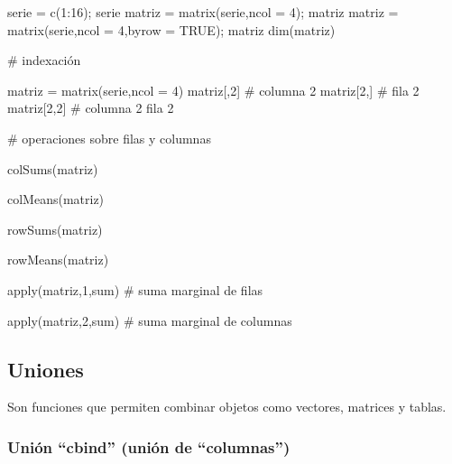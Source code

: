 \documentclass[
  spanish,
  letterpaper,
  DIV=11,
  numbers=noendperiod]{scrreprt}
\newenvironment{Shaded}{\begin{snugshade}}{\end{snugshade}}
\newcommand{\AttributeTok}[1]{\textcolor[rgb]{0.40,0.45,0.13}{#1}}
\newcommand{\CommentTok}[1]{\textcolor[rgb]{0.37,0.37,0.37}{#1}}
\newcommand{\ConstantTok}[1]{\textcolor[rgb]{0.56,0.35,0.01}{#1}}
\newcommand{\DecValTok}[1]{\textcolor[rgb]{0.68,0.00,0.00}{#1}}
\newcommand{\FunctionTok}[1]{\textcolor[rgb]{0.28,0.35,0.67}{#1}}
\newcommand{\NormalTok}[1]{\textcolor[rgb]{0.00,0.23,0.31}{#1}}
\newcommand{\OtherTok}[1]{\textcolor[rgb]{0.00,0.23,0.31}{#1}}
\newcommand{\SpecialCharTok}[1]{\textcolor[rgb]{0.37,0.37,0.37}{#1}}
\begin{document}
\begin{Shaded}
\begin{Highlighting}[]

\NormalTok{serie }\OtherTok{=} \FunctionTok{c}\NormalTok{(}\DecValTok{1}\SpecialCharTok{:}\DecValTok{16}\NormalTok{); serie}
\NormalTok{matriz }\OtherTok{=} \FunctionTok{matrix}\NormalTok{(serie,}\AttributeTok{ncol =} \DecValTok{4}\NormalTok{); matriz}
\NormalTok{matriz }\OtherTok{=} \FunctionTok{matrix}\NormalTok{(serie,}\AttributeTok{ncol =} \DecValTok{4}\NormalTok{,}\AttributeTok{byrow =} \ConstantTok{TRUE}\NormalTok{); matriz}
\FunctionTok{dim}\NormalTok{(matriz)}

\CommentTok{\# indexación}

\NormalTok{matriz }\OtherTok{=} \FunctionTok{matrix}\NormalTok{(serie,}\AttributeTok{ncol =} \DecValTok{4}\NormalTok{)}
\NormalTok{matriz[,}\DecValTok{2}\NormalTok{] }\CommentTok{\# columna 2}
\NormalTok{matriz[}\DecValTok{2}\NormalTok{,] }\CommentTok{\# fila 2}
\NormalTok{matriz[}\DecValTok{2}\NormalTok{,}\DecValTok{2}\NormalTok{] }\CommentTok{\# columna 2 fila 2}

\CommentTok{\# operaciones sobre filas y columnas}

\FunctionTok{colSums}\NormalTok{(matriz)}

\FunctionTok{colMeans}\NormalTok{(matriz)}

\FunctionTok{rowSums}\NormalTok{(matriz)}

\FunctionTok{rowMeans}\NormalTok{(matriz)}

\FunctionTok{apply}\NormalTok{(matriz,}\DecValTok{1}\NormalTok{,sum) }\CommentTok{\# suma marginal de filas}

\FunctionTok{apply}\NormalTok{(matriz,}\DecValTok{2}\NormalTok{,sum) }\CommentTok{\# suma marginal de columnas}
\end{Highlighting}
\end{Shaded}

\subsection{Uniones}\label{uniones}

Son funciones que permiten combinar objetos como vectores, matrices y
tablas.

\subsubsection{Unión ``cbind'' (unión de
``columnas'')}\label{uniuxf3n-cbind-uniuxf3n-de-columnas}
\end{document}
